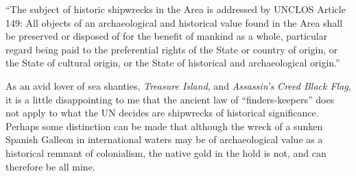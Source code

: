 
\date{Admiralty Law -- 01 APR 2024}


\begin{flushleft}
\thetitle

\thedate

\theauthor
\end{flushleft}

``The subject of historic shipwrecks in the Area is addressed by UNCLOS Article 149: All objects of an archaeological and historical value found in the Area shall be preserved or disposed of for the benefit of mankind as a whole, particular regard being paid to the preferential rights of the State or country of origin, or the State of cultural origin, or the State of historical and archaeological origin.'' 

As an avid lover of sea shanties, \textit{Treasure Island}, and \textit{Assassin's Creed Black Flag}, it is a little disappointing to me that the ancient law of ``finders-keepers'' does not apply to what the UN decides are shipwrecks of historical significance.
Perhaps some distinction can be made that although the wreck of a sunken Spanish Galleon in international waters may be of archaeological value as a historical remnant of colonialism, the native gold in the hold is not, and can therefore be all mine.

